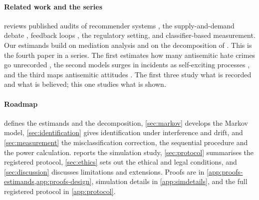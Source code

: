\paragraph{Related work and the series}
 reviews published audits of recommender systems
\citep{sandvig2014,ribeiro2020,huszar2022,haroon2023,guess2023,hosseinmardi2024},
the supply-and-demand debate \citep{munger2022}, feedback loops
\citep{chaney2018,jiang2019}, the regulatory setting, and classifier-based
measurement. Our estimands build on mediation analysis
\citep{robins1992,pearl2001,vanderweele2014} and on the decomposition of
\citet{kitagawa1955}. This is the fourth paper in a series. The first
estimates how many antisemitic hate crimes go unrecorded
\citep{kornsteinlab2026darkfigure}, the second models surges in incidents as
self-exciting processes \citep{kornsteinlab2026contagion}, and the third maps
antisemitic attitudes \citep{kornsteinlab2026attitudes}. The first three study
what is recorded and what is believed; this one studies what is shown.

\paragraph{Roadmap}
 defines the estimands and the decomposition,
\cref{sec:markov} develops the Markov model, \cref{sec:identification} gives
identification under interference and drift, and \cref{sec:measurement} the
misclassification correction, the sequential procedure and the power
calculation.  reports the simulation study,
\cref{sec:protocol} summarises the registered protocol, \cref{sec:ethics}
sets out the ethical and legal conditions, and \cref{sec:discussion}
discusses limitations and extensions. Proofs are in
\cref{app:proofs-estimands,app:proofs-design}, simulation details in
\cref{app:simdetails}, and the full registered protocol in \cref{app:protocol}.
